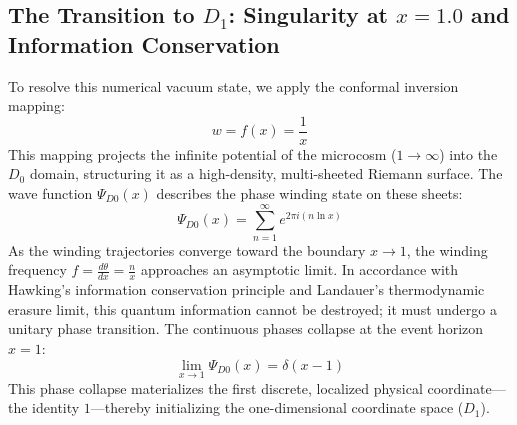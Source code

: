 \documentclass[11pt,a4paper]{article}
\theoremstyle{plain}
\theoremstyle{definition}
\theoremstyle{remark}
\begin{document}
\subsection{The Transition to $D_1$: Singularity at $x = 1.0$ and Information Conservation}
To resolve this numerical vacuum state, we apply the conformal inversion mapping:
\begin{equation}
w = f(x) = \frac{1}{x}
\end{equation}
This mapping projects the infinite potential of the microcosm ($1 \to \infty$) into the $D_0$ domain, structuring it as a high-density, multi-sheeted Riemann surface. The wave function $\Psi_{D0}(x)$ describes the phase winding state on these sheets:
\begin{equation}
\Psi_{D0}(x) = \sum_{n=1}^{\infty} e^{2\pi i (n \ln x)}
\end{equation}
As the winding trajectories converge toward the boundary $x \to 1$, the winding frequency $f = \frac{d\theta}{dx} = \frac{n}{x}$ approaches an asymptotic limit. In accordance with Hawking's information conservation principle and Landauer's thermodynamic erasure limit, this quantum information cannot be destroyed; it must undergo a unitary phase transition. The continuous phases collapse at the event horizon $x = 1$:
\begin{equation}
\lim_{x \to 1} \Psi_{D0}(x) = \delta(x - 1)
\end{equation}
This phase collapse materializes the first discrete, localized physical coordinate—the identity $1$—thereby initializing the one-dimensional coordinate space ($D_1$).

\newpage
\end{document}

